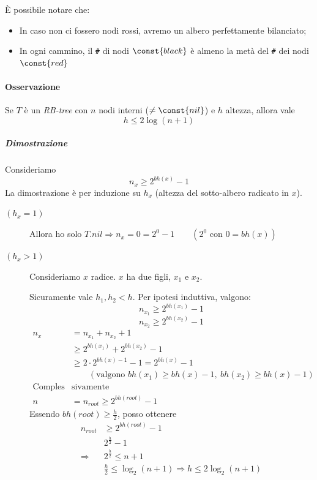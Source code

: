 È possibile notare che: 
\begin{itemize}
    \item In caso non ci fossero nodi rossi, avremo un albero
    perfettamente bilanciato;
    \item In ogni cammino, il \verb|#| di nodi $\const{black}$ è almeno la
    metà del \verb|#| dei nodi $\const{red}$
\end{itemize}

\paragraph{Osservazione} Se $T$ è un \emph{RB-tree} con $n$ nodi interni ($\neq \const{nil}$)
e $h$ altezza, allora vale
$$h \leq 2 \log (n + 1)$$

\subparagraph{Dimostrazione} Consideriamo 
$$n_x \geq 2^{bh(x)} - 1$$
La dimostrazione è per induzione su $h_x$ (altezza del sotto-albero radicato in $x$).

\begin{description}
    \item[$(h_x = 1)$] Allora ho solo 
    $T.nil \Rightarrow n_x = 0 = 2^0 - 1 \qquad (2^0 \text{ con } 0 = bh(x))$
    \item[$(h_x > 1)$] Consideriamo $x$ radice. $x$ ha due figli, $x_1$ e $x_2$.\par
    Sicuramente vale $h_1,h_2 < h$. Per ipotesi induttiva, valgono:
    $$n_{x_1} \geq 2^{bh(x_1)} - 1$$
    $$n_{x_2} \geq 2^{bh(x_2)} - 1$$
    \begin{align*}
        n_x & = n_{x_1} + n_{x_2} + 1 \\
        & \geq 2^{bh(x_1)} + 2^{bh(x_2)} - 1 \\
        & \geq 2 \cdot 2^{bh(x)-1} - 1 = 2^{bh(x)} - 1 \\
        & \qquad (\text{valgono } bh(x_1) \geq bh(x)-1, \ bh(x_2) \geq bh(x)-1) \\
        \text{Comples}&\text{sivamente}\\
        n & = n_{root} \geq 2^{bh(root)} - 1
    \end{align*}
    Essendo $bh(root) \geq \frac{h}{2}$, posso ottenere
    \begin{align*}
        n_{root} & \geq 2^{bh(root)} - 1 \\
        & 2^{\frac{h}{2}} - 1 \\
        \Rightarrow \ & 2^{\frac{h}{2}} \leq n + 1 \\
        & \frac{h}{2} \leq \log_2(n+1) \Rightarrow h \leq 2 \log_2(n+1) 
    \end{align*}
\end{description}

